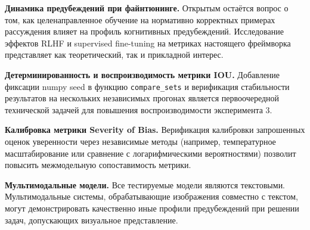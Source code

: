 \textbf{Динамика предубеждений при файнтюнинге.} Открытым остаётся вопрос о том, как целенаправленное обучение на нормативно корректных примерах рассуждения влияет на профиль когнитивных предубеждений. Исследование эффектов RLHF и supervised fine-tuning на метриках настоящего фреймворка представляет как теоретический, так и прикладной интерес.

\textbf{Детерминированность и воспроизводимость метрики IOU.} Добавление фиксации numpy seed в функцию \texttt{compare\_sets} и верификация стабильности результатов на нескольких независимых прогонах является первоочередной технической задачей для повышения воспроизводимости эксперимента 3.

\textbf{Калибровка метрики Severity of Bias.} Верификация калибровки запрошенных оценок уверенности через независимые методы (например, температурное масштабирование или сравнение с логарифмическими вероятностями) позволит повысить межмодельную сопоставимость метрики.

\textbf{Мультимодальные модели.} Все тестируемые модели являются текстовыми. Мультимодальные системы, обрабатывающие изображения совместно с текстом, могут демонстрировать качественно иные профили предубеждений при решении задач, допускающих визуальное представление.
